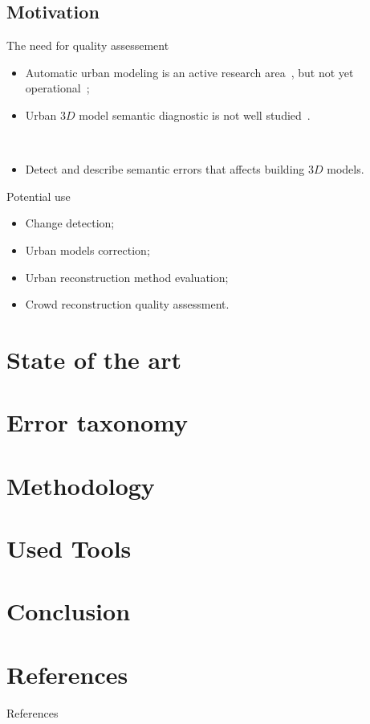 \documentclass{beamer}
\begin{document}
        \subsection{Motivation}
            \begin{frame}{The need for quality assessement}
                \begin{itemize}[label=$\blacktriangleright$, font=\color{IGNGreen}]
                    \item<1-> Automatic urban modeling is an active research area~\cite{Musialski2012}, but not \textcolor{IGNRed}{yet operational}~\cite{rottensteiner2014results};
                    \item<2-> Urban $3D$ model semantic diagnostic is not well studied~\cite{nguatem2017modeling}.
                \end{itemize}
                ~\\
                \begin{itemize}[label=Goal $\longrightarrow$, font=\color{purple}, leftmargin=2cm]
                    \item Detect and describe semantic errors that affects building $3D$ models.
                \end{itemize}
            \end{frame}

            \begin{frame}{Potential use}
                \begin{itemize}[label=$\blacktriangleright$, font=\color{IGNGreen}]
                    \item<1-> Change detection;
                    \item<2-> Urban models correction;
                    \item<3-> Urban reconstruction method evaluation;
                    \item<4-> Crowd reconstruction quality assessment.
                \end{itemize}
            \end{frame}
    \section{State of the art}
    \section{Error taxonomy}
    \section{Methodology}
    \section{Used Tools}
    \section{Conclusion}

    \section*{References}
        \begin{frame}[allowframebreaks]{References}
            
            
        \end{frame}
\end{document}
